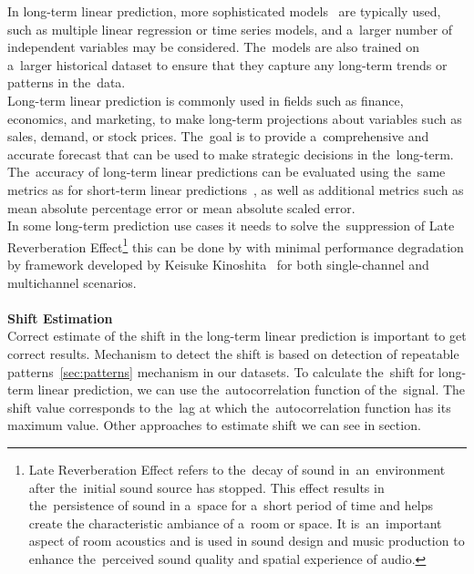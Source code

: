 In long-term linear prediction, more sophisticated models~\cite{Nave} are typically used, such as multiple linear
regression or time series models, and a~larger number of independent variables may be considered. The~models are also
trained on a~larger historical dataset to ensure that they capture any long-term trends or patterns in the~data.
\\
Long-term linear prediction is commonly used in fields such as finance, economics, and marketing, to make long-term
projections about variables such as sales, demand, or stock prices. The~goal is to provide a~comprehensive and accurate
forecast that can be used to make strategic decisions in the~long-term. The~accuracy of long-term linear predictions
can be evaluated using the~same metrics as for short-term linear predictions~\cite{Baker}, as well as additional metrics
such as mean absolute percentage error or mean absolute scaled error.
\\
In some long-term prediction use cases it needs to solve the~suppression of Late Reverberation
Effect\footnote{Late Reverberation Effect refers to the~decay of sound in~an~environment after the~initial sound source
has stopped. This effect results in the~persistence of sound in a~space for a~short period of time and helps create the
characteristic ambiance of a~room or space. It is~an~important aspect of room acoustics and is used in sound
design and music production to enhance the~perceived sound quality and spatial experience of audio.} this can be done
by with minimal performance degradation by framework developed by Keisuke Kinoshita~\cite{Kinoshita} for both
single-channel and multichannel scenarios.\\
\\
\textbf{Shift Estimation}\\
Correct estimate of the shift in the long-term linear prediction is important to get correct results. Mechanism to
detect the shift is based on detection of repeatable patterns~\ref{sec:patterns} mechanism in our datasets.
To calculate the~shift for long-term linear prediction, we can use the~autocorrelation function of the~signal.
The shift value corresponds to the~lag at which the~autocorrelation function has its maximum value. Other
approaches to estimate shift we can see in section.

